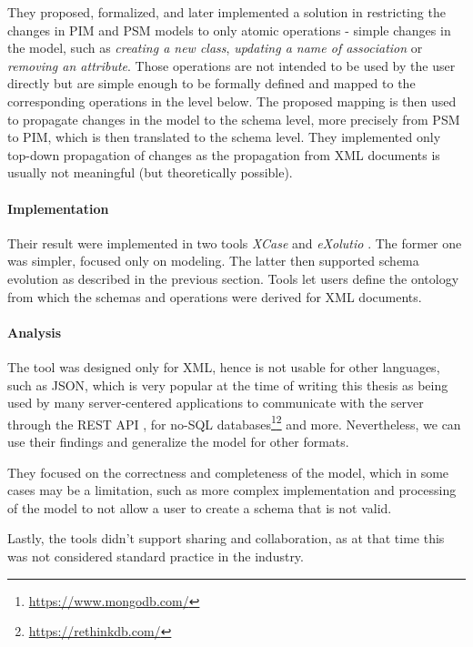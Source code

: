 They proposed, formalized, and later implemented a solution in restricting the changes in PIM and PSM models to only atomic operations - simple changes in the model, such as \textit{creating a new class}, \textit{updating a name of association} or \textit{removing an attribute}. Those operations are not intended to be used by the user directly but are simple enough to be formally defined and mapped to the corresponding operations in the level below. The proposed mapping is then used to propagate changes in the model to the schema level, more precisely from PSM to PIM, which is then translated to the schema level. They implemented only top-down propagation of changes as the propagation from XML documents is usually not meaningful (but theoretically possible).

\paragraph{Implementation} Their result were implemented in two tools \textit{XCase} \cite{xcase} and \textit{eXolutio} \cite{exolutio}. The former one was simpler, focused only on modeling. The latter then supported schema evolution as described in the previous section. Tools let users define the ontology from which the schemas and operations were derived for XML documents.

\paragraph{Analysis} The tool was designed only for XML, hence is not usable for other languages, such as JSON, which is very popular at the time of writing this thesis as being used by many server-centered applications to communicate with the server through the REST API \cite{fielding2000architectural}, for no-SQL databases\footnote{\url{https://www.mongodb.com/}}\footnote{\url{https://rethinkdb.com/}} and more. Nevertheless, we can use their findings and generalize the model for other formats.

They focused on the correctness and completeness of the model, which in some cases may be a limitation, such as more complex implementation and processing of the model to not allow a user to create a schema that is not valid.

Lastly, the tools didn't support sharing and collaboration, as at that time this was not considered standard practice in the industry.